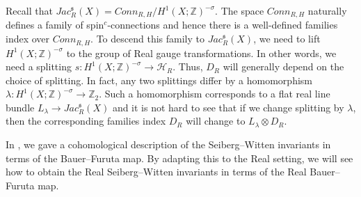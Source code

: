 \documentclass{amsart}
\theoremstyle{definition}
\theoremstyle{remark}
\numberwithin{equation}{section}
\begin{document}
Recall that $Jac^{\mathfrak{s}}_R(X) = Conn_{R,H}/H^1(X ; \mathbb{Z})^{-\sigma}$. The space $Conn_{R,H}$ naturally defines a family of spin$^c$-connections and hence there is a well-defined families index over $Conn_{R,H}$. To descend this family to $Jac^{\mathfrak{s}}_R(X)$, we need to lift $H^1(X ; \mathbb{Z})^{-\sigma}$ to the group of Real gauge transformations. In other words, we need a splitting $s : H^1(X ; \mathbb{Z})^{-\sigma} \to \mathcal{H}_R$. Thus, $D_R$ will generally depend on the choice of splitting. In fact, any two splittings differ by a homomorphism $\lambda : H^1(X ; \mathbb{Z})^{-\sigma} \to \mathbb{Z}_2$. Such a homomorphism corresponds to a flat real line bundle $L_\lambda \to Jac_R^{\mathfrak{s}}(X)$ and it is not hard to see that if we change splitting by $\lambda$, then the corresponding families index $D_R$ will change to $L_\lambda \otimes D_R$.

In \cite{bk}, we gave a cohomological description of the Seiberg--Witten invariants in terms of the Bauer--Furuta map. By adapting this to the Real setting, we will see how to obtain the Real Seiberg--Witten invariants in terms of the Real Bauer--Furuta map.
\end{document}
